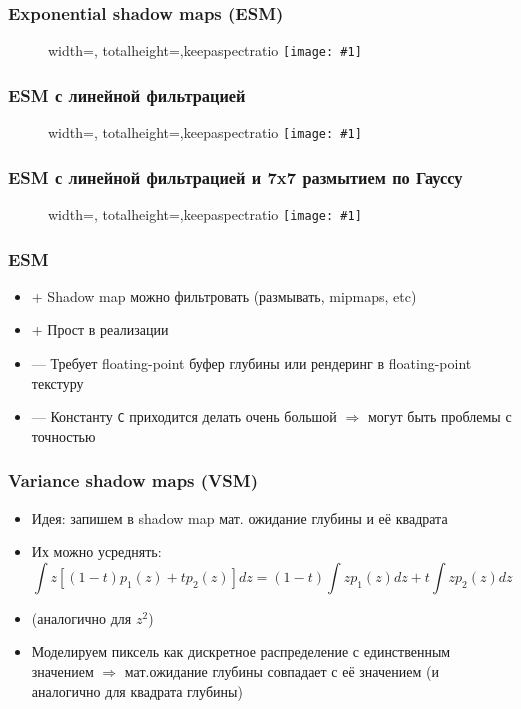 \documentclass[10pt]{beamer}
\newcommand{\slideimage}[1]{
  \begin{figure}
    \begin{adjustbox}{width=\textwidth, totalheight=\textheight-2\baselineskip-2\baselineskip,keepaspectratio}
      \texttt{[image: \#1]}
    \end{adjustbox}
  \end{figure}
}
\begin{document}
\begin{frame}[fragile]
\frametitle{Exponential shadow maps (ESM)}
\slideimage{exp_plot.png}
\end{frame}


\begin{frame}[fragile]
\frametitle{ESM с линейной фильтрацией}
\slideimage{exp.png}
\end{frame}

\begin{frame}[fragile]
\frametitle{ESM с линейной фильтрацией и 7x7 размытием по Гауссу}
\slideimage{exp_gauss.png}
\end{frame}

\begin{frame}[fragile]
\frametitle{ESM}
\begin{itemize}
\item {\color{green}+} Shadow map можно фильтровать (размывать, mipmaps, etc)
\item {\color{green}+} Прост в реализации
\item {\color{red}—} Требует floating-point буфер глубины или рендеринг в floating-point текстуру
\item {\color{red}—} Константу \verb|C| приходится делать очень большой \begin{math}\Rightarrow\end{math} могут быть проблемы с точностью
\end{itemize}
\end{frame}

\begin{frame}[fragile]
\frametitle{Variance shadow maps (VSM)}
\begin{itemize}
\item Идея: запишем в shadow map мат. ожидание глубины и её квадрата
\pause
\item Их можно усреднять:
\begin{equation}
\int z \left[(1-t)p_1(z) + tp_2(z)\right] dz = (1-t)\int z p_1(z) dz + t\int z p_2(z) dz
\end{equation}
\item (аналогично для \begin{math}z^2\end{math})
\pause
\item Моделируем пиксель как дискретное распределение с единственным значением \begin{math}\Rightarrow\end{math} мат.ожидание глубины совпадает с её значением (и аналогично для квадрата глубины)
\end{itemize}
\end{frame}
\end{document}
